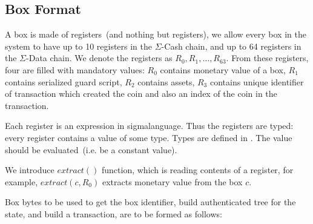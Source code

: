 \documentclass[]{article}   %
\newcommand{\authnote}[2]{\marginpar{\parbox{\marginparwidth}{\tiny %
  \textsf{#1 {\textcolor{blue}{notes: #2}}}}}%
  \textcolor{blue}{\textbf{\dag}}}
\newcommand{\authnote}[2]{
  \textsf{#1 \textcolor{blue}{: #2}}}
\newcommand{\authnote}[2]{}
\newcommand{\knote}[1]{{\authnote{\textcolor{green}{Alex notes}}{#1}}}
\newcommand{\ecash}{$\Sigma$-Cash}
\newcommand{\edata}{$\Sigma$-Data}
\newcommand{\coin}{box}
\newcommand{\Coin}{Box}
\newcommand{\sigm}{sigma}
\newcommand{\extract}[1]{$extract({#1})$}
\begin{document}
\subsection{\Coin{} Format}
\label{box-format}

A \coin{} is made of registers~(and nothing but registers), we allow every \coin{} in the system to have up to 10 registers in the \ecash{} chain,
and up to 64 registers in the \edata{} chain. We denote the registers as $R_0,R_1,\ldots,R_{63}$.
From these registers, four are filled with mandatory values: $R_0$ contains monetary value of a \coin{}, $R_1$ contains
serialized guard script, $R_2$ contains assets, $R_3$ contains unique identifier of transaction which created the
coin and also an index of the coin in the transaction.

Each register is an expression in \sigm language. Thus the registers are typed: every register contains a value of
some type. Types are defined in \knote{ref}. The value should be evaluated~(i.e. be a constant value).

We introduce \extract{} function, which is reading contents of a register, for example, \extract{c, R_0} extracts monetary value
from the \coin{} $c$.

\Coin{} bytes to be used to get the \coin{} identifier, build authenticated tree for the state, and build a transaction,
are to be formed as follows:
\end{document}
